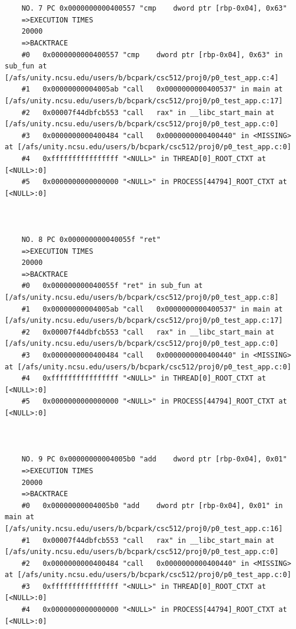 \documentclass[11pt]{article}
\begin{document}
\begin{verbatim}
    
    
    NO. 7 PC 0x0000000000400557 "cmp    dword ptr [rbp-0x04], 0x63"
    =>EXECUTION TIMES
    20000
    =>BACKTRACE
    #0   0x0000000000400557 "cmp    dword ptr [rbp-0x04], 0x63" in sub_fun at [/afs/unity.ncsu.edu/users/b/bcpark/csc512/proj0/p0_test_app.c:4]
    #1   0x00000000004005ab "call   0x0000000000400537" in main at [/afs/unity.ncsu.edu/users/b/bcpark/csc512/proj0/p0_test_app.c:17]
    #2   0x00007f44dbfcb553 "call   rax" in __libc_start_main at [/afs/unity.ncsu.edu/users/b/bcpark/csc512/proj0/p0_test_app.c:0]
    #3   0x0000000000400484 "call   0x0000000000400440" in <MISSING> at [/afs/unity.ncsu.edu/users/b/bcpark/csc512/proj0/p0_test_app.c:0]
    #4   0xffffffffffffffff "<NULL>" in THREAD[0]_ROOT_CTXT at [<NULL>:0]
    #5   0x0000000000000000 "<NULL>" in PROCESS[44794]_ROOT_CTXT at [<NULL>:0]
    
    
    
    NO. 8 PC 0x000000000040055f "ret"
    =>EXECUTION TIMES
    20000
    =>BACKTRACE
    #0   0x000000000040055f "ret" in sub_fun at [/afs/unity.ncsu.edu/users/b/bcpark/csc512/proj0/p0_test_app.c:8]
    #1   0x00000000004005ab "call   0x0000000000400537" in main at [/afs/unity.ncsu.edu/users/b/bcpark/csc512/proj0/p0_test_app.c:17]
    #2   0x00007f44dbfcb553 "call   rax" in __libc_start_main at [/afs/unity.ncsu.edu/users/b/bcpark/csc512/proj0/p0_test_app.c:0]
    #3   0x0000000000400484 "call   0x0000000000400440" in <MISSING> at [/afs/unity.ncsu.edu/users/b/bcpark/csc512/proj0/p0_test_app.c:0]
    #4   0xffffffffffffffff "<NULL>" in THREAD[0]_ROOT_CTXT at [<NULL>:0]
    #5   0x0000000000000000 "<NULL>" in PROCESS[44794]_ROOT_CTXT at [<NULL>:0]
    
    
    
    NO. 9 PC 0x00000000004005b0 "add    dword ptr [rbp-0x04], 0x01"
    =>EXECUTION TIMES
    20000
    =>BACKTRACE
    #0   0x00000000004005b0 "add    dword ptr [rbp-0x04], 0x01" in main at [/afs/unity.ncsu.edu/users/b/bcpark/csc512/proj0/p0_test_app.c:16]
    #1   0x00007f44dbfcb553 "call   rax" in __libc_start_main at [/afs/unity.ncsu.edu/users/b/bcpark/csc512/proj0/p0_test_app.c:0]
    #2   0x0000000000400484 "call   0x0000000000400440" in <MISSING> at [/afs/unity.ncsu.edu/users/b/bcpark/csc512/proj0/p0_test_app.c:0]
    #3   0xffffffffffffffff "<NULL>" in THREAD[0]_ROOT_CTXT at [<NULL>:0]
    #4   0x0000000000000000 "<NULL>" in PROCESS[44794]_ROOT_CTXT at [<NULL>:0]
    
    
    

\end{verbatim}
\end{document}
